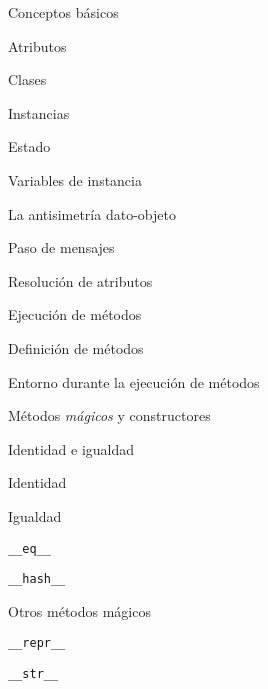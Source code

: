 \begin{longenum}
\begin{longenum}
        \item Conceptos básicos
        \begin{longenum}
            \item Atributos
            \item Clases
            \begin{longenum}
                \item Instancias
            \end{longenum}
            \item Estado
            \begin{longenum}
                \item Variables de instancia
            \end{longenum}
            \item La antisimetría dato-objeto
        \end{longenum}
        \item Paso de mensajes
        \begin{longenum}
            \item Resolución de atributos
            \item Ejecución de métodos
            \item Definición de métodos
            \begin{longenum}
                \item Entorno durante la ejecución de métodos
            \end{longenum}
            \item Métodos \textit{mágicos} y constructores
        \end{longenum}
        \item Identidad e igualdad
        \begin{longenum}
            \item Identidad
            \item Igualdad
            \begin{longenum}
                \item \texttt{\_\_eq\_\_}
                \item \texttt{\_\_hash\_\_}
            \end{longenum}
            \item Otros métodos mágicos
            \begin{longenum}
                \item \texttt{\_\_repr\_\_}
                \item \texttt{\_\_str\_\_}
            \end{longenum}

\end{longenum}
\end{longenum}
\end{longenum}
